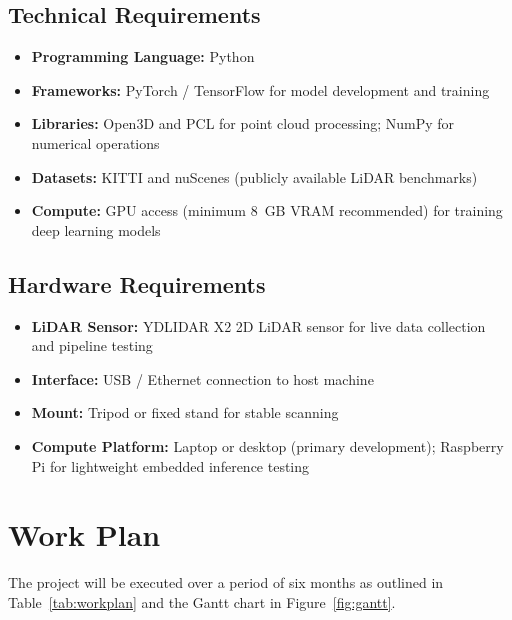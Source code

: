 \documentclass[12pt,a4paper]{article}
\begin{document}
\subsection*{Technical Requirements}
\begin{itemize}
\item \textbf{Programming Language:} Python
\item \textbf{Frameworks:} PyTorch / TensorFlow for model development and training
\item \textbf{Libraries:} Open3D and PCL for point cloud processing; NumPy for
      numerical operations
\item \textbf{Datasets:} KITTI and nuScenes (publicly available LiDAR benchmarks)
\item \textbf{Compute:} GPU access (minimum 8~GB VRAM recommended) for training
      deep learning models
\end{itemize}

\subsection*{Hardware Requirements}
\begin{itemize}
\item \textbf{LiDAR Sensor:} YDLIDAR X2 2D LiDAR sensor for live data collection
      and pipeline testing
\item \textbf{Interface:} USB / Ethernet connection to host machine
\item \textbf{Mount:} Tripod or fixed stand for stable scanning
\item \textbf{Compute Platform:} Laptop or desktop (primary development);
      Raspberry Pi for lightweight embedded inference testing
\end{itemize}
\clearpage

\section{Work Plan}

The project will be executed over a period of six months as outlined in
Table~\ref{tab:workplan} and the Gantt chart in Figure~\ref{fig:gantt}.
\end{document}
